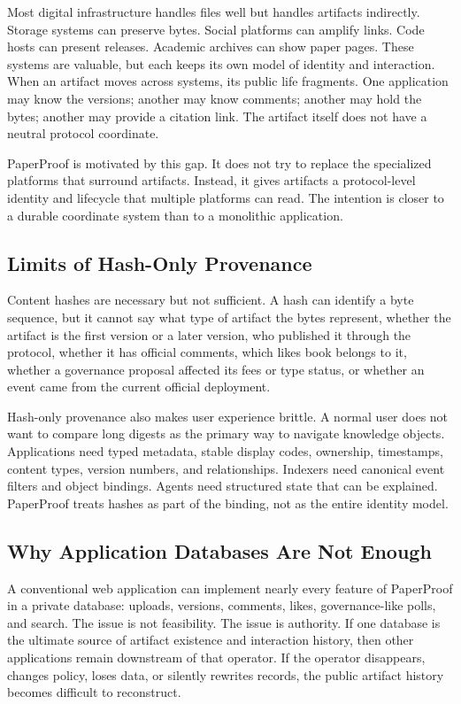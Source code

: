 \documentclass[journal]{IEEEtran}
\begin{document}
Most digital infrastructure handles files well but handles artifacts indirectly. Storage systems can preserve bytes. Social platforms can amplify links. Code hosts can present releases. Academic archives can show paper pages. These systems are valuable, but each keeps its own model of identity and interaction. When an artifact moves across systems, its public life fragments. One application may know the versions; another may know comments; another may hold the bytes; another may provide a citation link. The artifact itself does not have a neutral protocol coordinate.

PaperProof is motivated by this gap. It does not try to replace the specialized platforms that surround artifacts. Instead, it gives artifacts a protocol-level identity and lifecycle that multiple platforms can read. The intention is closer to a durable coordinate system than to a monolithic application.

\subsection{Limits of Hash-Only Provenance}

Content hashes are necessary but not sufficient. A hash can identify a byte sequence, but it cannot say what type of artifact the bytes represent, whether the artifact is the first version or a later version, who published it through the protocol, whether it has official comments, which likes book belongs to it, whether a governance proposal affected its fees or type status, or whether an event came from the current official deployment.

Hash-only provenance also makes user experience brittle. A normal user does not want to compare long digests as the primary way to navigate knowledge objects. Applications need typed metadata, stable display codes, ownership, timestamps, content types, version numbers, and relationships. Indexers need canonical event filters and object bindings. Agents need structured state that can be explained. PaperProof treats hashes as part of the binding, not as the entire identity model.

\subsection{Why Application Databases Are Not Enough}

A conventional web application can implement nearly every feature of PaperProof in a private database: uploads, versions, comments, likes, governance-like polls, and search. The issue is not feasibility. The issue is authority. If one database is the ultimate source of artifact existence and interaction history, then other applications remain downstream of that operator. If the operator disappears, changes policy, loses data, or silently rewrites records, the public artifact history becomes difficult to reconstruct.
\end{document}
